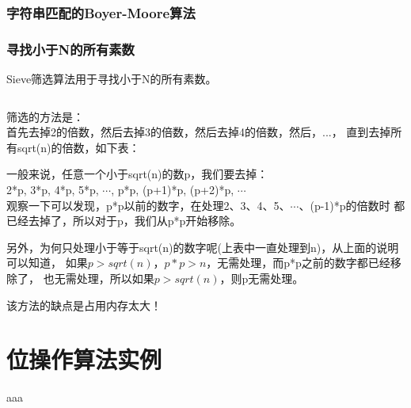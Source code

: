 ﻿\documentclass[a4paper,11pt]{article}
\begin{document}
  \section[字符串匹配的Boyer-Moore算法]{字符串匹配的Boyer-Moore算法}
  
  \section[寻找小于N的所有素数]{寻找小于N的所有素数}
  Sieve筛选算法用于寻找小于N的所有素数。\par
  \inputminted[linenos,tabsize=4,bgcolor=srcbg]{cpp}{srcdir/Sieve.c}
  
  筛选的方法是：\\
  首先去掉2的倍数，然后去掉3的倍数，然后去掉4的倍数，然后，...，
  直到去掉所有sqrt(n)的倍数，如下表：\par
  
  一般来说，任意一个小于sqrt(n)的数p，我们要去掉：\\
  2*p, 3*p, 4*p, 5*p, $\cdots$, p*p, (p+1)*p, (p+2)*p, $\cdots$\\
  观察一下可以发现，p*p以前的数字，在处理2、3、4、5、$\cdots$、(p-1)*p的倍数时
  都已经去掉了，所以对于p，我们从p*p开始移除。
  
  另外，为何只处理小于等于sqrt(n)的数字呢(上表中一直处理到n)，从上面的说明可以知道，
  如果$p>sqrt(n)$，$p*p>n$，无需处理，而p*p之前的数字都已经移除了，
  也无需处理，所以如果$p>sqrt(n)$，则p无需处理。
  
  该方法的缺点是占用内存太大！

  \part[位操作算法实例]{位操作算法实例}
  aaa
\end{document}
